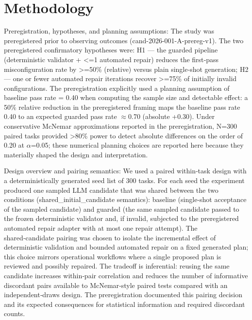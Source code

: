 \documentclass[conference]{IEEEtran}
\begin{document}
\section{Methodology}
Preregistration, hypotheses, and planning assumptions: The study was preregistered prior to observing outcomes (cand-2026-001-A-prereg-v1). The two preregistered confirmatory hypotheses were: H1 --- the guarded pipeline (deterministic validator + <=1 automated repair) reduces the first‑pass misconfiguration rate by >=50\% (relative) versus plain single‑shot generation; H2 --- one or fewer automated repair iterations recover >=75\% of initially invalid configurations. The preregistration explicitly used a planning assumption of baseline pass rate = 0.40 when computing the sample size and detectable effect: a 50\% relative reduction in the preregistered framing maps the baseline pass rate 0.40 to an expected guarded pass rate \ensuremath{\approx}0.70 (absolute +0.30). Under conservative McNemar approximations reported in the preregistration, N=300 paired tasks provided >80\% power to detect absolute differences on the order of 0.20 at \ensuremath{\alpha}=0.05; these numerical planning choices are reported here because they materially shaped the design and interpretation.

Design overview and pairing semantics: We used a paired within‑task design with a deterministically generated seed list of 300 tasks. For each seed the experiment produced one sampled LLM candidate that was shared between the two conditions (shared\_initial\_candidate semantics): baseline (single‑shot acceptance of the sampled candidate) and guarded (the same sampled candidate passed to the frozen deterministic validator and, if invalid, subjected to the preregistered automated repair adapter with at most one repair attempt). The shared‑candidate pairing was chosen to isolate the incremental effect of deterministic validation and bounded automated repair on a fixed generated plan; this choice mirrors operational workflows where a single proposed plan is reviewed and possibly repaired. The tradeoff is inferential: reusing the same candidate increases within‑pair correlation and reduces the number of informative discordant pairs available to McNemar‑style paired tests compared with an independent‑draws design. The preregistration documented this pairing decision and its expected consequences for statistical information and required discordant counts.
\end{document}

